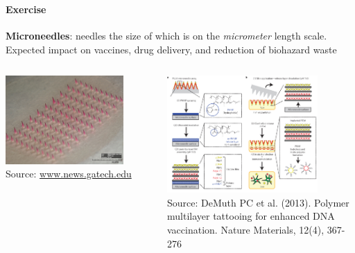 \documentclass[8pt]{beamer}
\begin{document}
\begin{frame}
\frametitle{\insertsection}
\framesubtitle{Exercise}

\textbf{Microneedles}: needles the size of which is on the \textit{micrometer} length scale. Expected impact on vaccines, drug delivery, and reduction of biohazard waste
   
\begin{columns}

\begin{minipage}[c][.6\textheight][c]{\linewidth}
\centering
\includegraphics[width=0.8\textwidth,keepaspectratio]{micro1}\\
\tiny{Source: \url{www.news.gatech.edu}}	 	
\end{minipage}
        
\begin{minipage}[c][.6\textheight][c]{\linewidth}
\centering
\includegraphics[width=0.8\textwidth,keepaspectratio]{micro2}\\
\tiny{Source: DeMuth PC et al. (2013). Polymer multilayer tattooing for enhanced DNA vaccination. Nature Materials, 12(4), 367-276}
\end{minipage}

\end{columns}


\end{frame}
\end{document}
